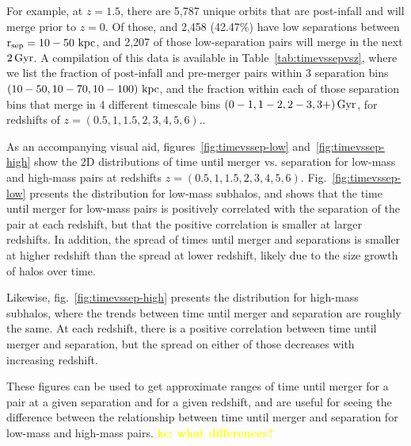 \documentclass[twocolumn,linenumbers]{aastex631}
\newcommand{\kc}[1]{\textcolor{yellow}{\textbf{kc: #1}} }
\newcommand{\rsep}{\ensuremath{\rm r_{sep}}}
\begin{document}
For example, at $z=1.5$, there are 5,787 unique orbits that are post-infall and will merge prior to $z=0$. Of those, and 2,458 (42.47\%) have low separations between $\rsep=10-50\,\kpc$, and 2,207 of those low-separation pairs will merge in the next $2\,\mathrm{Gyr}$. 
A compilation of this data is available in Table~\ref{tab:timevssepvsz}, where we list the fraction of post-infall and pre-merger pairs within 3 separation bins $(10-50, 10-70, 10-100)\,\mathrm{\,kpc}$, and the fraction within each of those separation bins that merge in 4 different timescale bins $(0-1, 1-2, 2-3, 3+)\,\mathrm{Gyr}$, for redshifts of $z=(0.5,1,1.5,2,3,4,5,6)$.. 

As an accompanying visual aid, figures~\ref{fig:timevssep-low} and~\ref{fig:timevssep-high} show the 2D distributions of time until merger vs. separation for low-mass and high-mass pairs at redshifts $z=(0.5,1,1.5,2,3,4,5,6)$. 
Fig.~\ref{fig:timevssep-low} presents the distribution for low-mass subhalos, and shows that the time until merger for low-mass pairs is positively correlated with the separation of the pair at each redshift, but that the positive correlation is smaller at larger redshifts. 
In addition, the spread of times until merger and separations is smaller at higher redshift  than the spread at lower redshift, likely due to the size growth of halos over time. 

Likewise, fig.~\ref{fig:timevssep-high} presents the distribution for high-mass subhalos, where the trends between time until merger and separation are roughly the same. 
At each redshift, there is a positive correlation between time until merger and separation, but the spread on either of those decreases with increasing redshift. 

These figures can be used to get approximate ranges of time until merger for a pair at a given separation and for a given redshift, and are useful for seeing the difference between the relationship between time until merger and separation for low-mass and high-mass pairs. \kc{what differences?} 
% 

\end{document}

